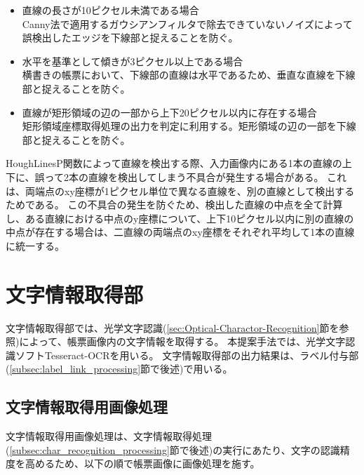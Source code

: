 \begin{itemize}
    \item 直線の長さが10ピクセル未満である場合\\
        Canny法で適用するガウシアンフィルタで除去できていないノイズによって誤検出したエッジを下線部と捉えることを防ぐ。
    \item 水平を基準として傾きが3ピクセル以上である場合\\
        横書きの帳票において、下線部の直線は水平であるため、垂直な直線を下線部と捉えることを防ぐ。
    \item 直線が矩形領域の辺の一部から上下20ピクセル以内に存在する場合\\
        矩形領域座標取得処理の出力を判定に利用する。矩形領域の辺の一部を下線部と捉えることを防ぐ。
\end{itemize}

HoughLinesP関数によって直線を検出する際、入力画像内にある1本の直線の上下に、誤って2本の直線を検出してしまう不具合が発生する場合がある。
これは、両端点のxy座標が1ピクセル単位で異なる直線を、別の直線として検出するためである。
この不具合の発生を防ぐため、検出した直線の中点を全て計算し、ある直線における中点のy座標について、上下10ピクセル以内に別の直線の中点が存在する場合は、二直線の両端点のxy座標をそれぞれ平均して1本の直線に統一する。

\section{文字情報取得部}\label{sec:OCR_part}
文字情報取得部では、光学文字認識(\ref{sec:Optical-Charactor-Recognition}節を参照)によって、帳票画像内の文字情報を取得する。
本提案手法では、光学文字認識ソフトTesseract-OCRを用いる。
文字情報取得部の出力結果は、ラベル付与部(\ref{subsec:label_link_processing}節で後述)で用いる。

\subsection{文字情報取得用画像処理}\label{subsec:image_processing_for_char_recognition}
文字情報取得用画像処理は、文字情報取得処理(\ref{subsec:char_recognition_processing}節で後述)の実行にあたり、文字の認識精度を高めるため、以下の順で帳票画像に画像処理を施す。

